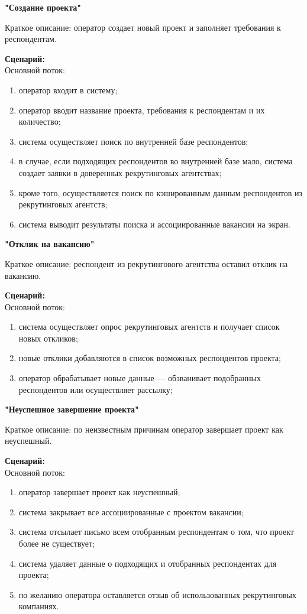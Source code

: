 \textbf{"Создание проекта"}

Краткое описание: оператор создает новый проект и заполняет требования к респондентам.

\textbf{Сценарий:}\\
Основной поток:
\begin{enumerate}
\item оператор входит в систему;
\item оператор вводит название проекта, требования к респондентам и их количество;
\item система осуществляет поиск по внутренней базе респондентов;
\item в случае, если подходящих респондентов во внутренней базе мало, система создает заявки в доверенных рекрутинговых агентствах;
\item кроме того, осуществляется поиск по кэшированным данным респондентов из рекрутинговых агентств;
\item система выводит результаты поиска и ассоциированные вакансии на экран.
\end{enumerate} 

\textbf{"Отклик на вакансию"}

Краткое описание: респондент из рекрутингового агентства оставил отклик на вакансию.

\textbf{Сценарий:}\\
Основной поток:
\begin{enumerate}
\item система осуществляет опрос рекрутинговых агентств и получает список новых откликов;
\item новые отклики добавляются в список возможных респондентов проекта;
\item оператор обрабатывает новые данные — обзванивает подобранных респондентов или осуществляет рассылку;
\end{enumerate} 

\textbf{"Неуспешное завершение проекта"}

Краткое описание: по неизвестным причинам оператор завершает проект как неуспешный.

\textbf{Сценарий:}\\
Основной поток:
\begin{enumerate}
\item оператор завершает проект как неуспешный;
\item система закрывает все ассоциированные с проектом вакансии;
\item система отсылает письмо всем отобранным респондентам о том, что проект более не существует;
\item система удаляет данные о подходящих и отобранных респондентах для проекта;
\item по желанию оператора оставляется отзыв об использованных рекрутинговых компаниях.
\end{enumerate}

